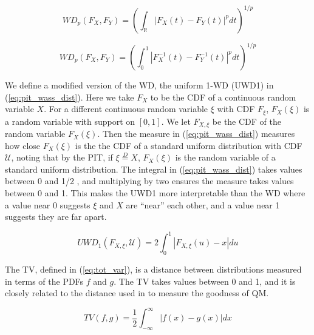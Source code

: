 \documentclass[preprint,12pt,authoryear]{elsarticle}
\newcommand{\1}[1]{\mathds{1}\left[#1\right]}
\begin{document}
\begin{equation}
    \label{eq:wass_dist_cdf}
    WD_p (F_X, F_Y) = \left( \int_{\mathbb{R}} |F_X(t) - F_Y(t)|^p dt\right)^{1/p}
\end{equation}

\begin{equation}
    \label{eq:wass_dist_quant}
    WD_p (F_X, F_Y) = \left( \int_0^1 |F^{-1}_X(t) - F^{-1}_Y(t)|^p dt \right)^{1/p}
\end{equation}

We define a modified version of the WD, the uniform 1-WD (UWD1) in 
(\ref{eq:pit_wass_dist}). Here we take $F_X$ to be the CDF of a continuous 
random variable $X$. For a different continuous random variable $\xi$ with CDF 
$F_{\xi}$, $F_X(\xi)$ is a random variable with support on $[0,1]$. We let 
$F_{X,\xi}$ be the CDF of the random variable $F_X(\xi)$. Then the measure in 
(\ref{eq:pit_wass_dist}) measures how close $F_X(\xi)$ is the the CDF of 
a standard uniform distribution with CDF $\mathcal{U}$, 
noting that by the PIT, if 
$\xi \overset{D}{=} X$, $F_X(\xi)$ is the random variable of a standard uniform 
distribution. The integral in (\ref{eq:pit_wass_dist}) takes values between
0 and 1/2 \cite[]{645854}, and multiplying by two 
ensures the measure takes values between 0 and 1. This makes the UWD1 more
interpretable than the WD
where a value near 0 suggests $\xi$ and $X$ are ``near'' each other, and a value
near 1 suggests they are far apart.   

\begin{equation}
    \label{eq:pit_wass_dist}
    UWD_1(F_{X,\xi}, \mathcal{U}) = 2\int_0^1 |F_{X,\xi} (u) - x|du
\end{equation}



The TV, defined in (\ref{eq:tot_var}), is a distance between distributions 
measured in terms of the PDFs $f$ and $g$. The TV takes values between 0 and 1, 
and it is closely related to the distance used in 
\cite{sgouropoulos2015matching} to measure the goodness of QM.  

\begin{equation}
    \label{eq:tot_var}
    TV(f,g) = \frac{1}{2} \int_{-\infty}^{\infty}|f(x) - g(x) | dx
\end{equation}

\end{document}
